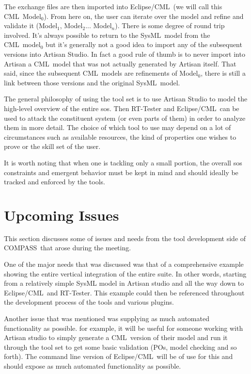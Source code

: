 \documentclass[a4paper,12pt,english]{article}
\def\compass{COMPASS}
\def\eclipsecml{Eclipse/CML}
\def\cml{CML}
\def\sysml{SysML}
\begin{document}
	The exchange files are then imported into \eclipsecml\ (we will call this \cml\ Model$_{0}$). From here on, the user can iterate over the model and refine and validate it (Model$_{1}$, Model$_{2}$... Model$_{n}$). There is some degree of round trip involved. It's always possible to return to the \sysml\ model from the \cml\ model$_{0}$ but it's generally not a good idea to import any of the subsequent versions into Artisan Studio. In fact a good rule of thumb is to never import into Artisan a \cml\ model that was not actually generated by Artisan itself. That said, since the subsequent \cml\ models are refinements of Model$_{0}$, there is still a link between those versions and the original \sysml\ model.

	The general philosophy of using the tool set is to use Artisan Studio to model the high-level overview of the entire \ac{sos}. Then RT-Tester and \eclipsecml\ can be used to attack the constituent system (or even parts of them) in order to analyze them in more detail. The choice of which tool to use may depend on a lot of circumstances such as available resources, the kind of properties one wishes to prove or the skill set of the user.
	
	It is worth noting that when one is tackling only a small portion, the overall \ac{sos} constraints and emergent behavior must be kept in mind and should ideally be tracked and enforced by the tools.
	

\section{Upcoming Issues}

	This section discusses some of issues and needs from the tool development side of \compass\ that arose during the meeting.
	
	One of the major needs that was discussed was that of a comprehensive example showing the entire vertical integration of the entire suite. In other words, starting from a relatively simple SysML model in Artisan studio and all the way down to \eclipsecml\ and RT-Tester. This example could then be referenced throughout the development process of the tools and various plugins.

	Another issue that was mentioned was supplying as much automated functionality as possible. for example, it will be useful for someone working with Artisan studio to simply generate a \cml\ version of their model and run it  through the tool set to get some basic validation (POs, model checking and so forth). The command line version of \eclipsecml\ will be of use for this and should expose as much automated functionality as possible.
	
\end{document}

